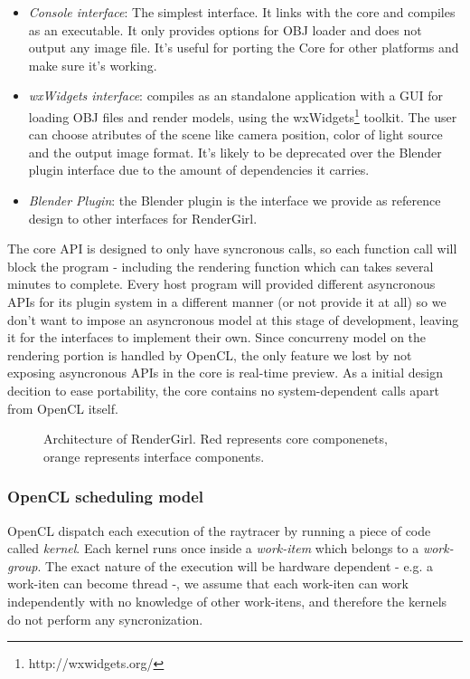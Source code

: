 \documentclass[a4paper]{sbgames}               %
\begin{document}
\begin{itemize}
\item \emph{Console interface}: The simplest interface. It links with
  the core and compiles as an executable. It only provides options for
  OBJ loader and does not output any image file. It's useful for
  porting the Core for other platforms and make sure it's working.
\item \emph{wxWidgets interface}: compiles as an standalone
  application with a GUI for loading OBJ files and render models,
  using the wxWidgets\footnote{http://wxwidgets.org/} toolkit. The
  user can choose atributes of the scene like camera position, color
  of light source and the output image format. It's likely to be
  deprecated over the Blender plugin interface due to the amount of
  dependencies it carries.
\item \emph{Blender Plugin}: the Blender plugin is the interface we
  provide as reference design to other interfaces for RenderGirl.
\end{itemize}

The core API is designed to only have syncronous calls, so each
function call will block the program - including the rendering
function which can takes several minutes to complete. Every host
program will provided different asyncronous APIs for its plugin system
in a different manner (or not provide it at all) so we don't want to
impose an asyncronous model at this stage of development, leaving it
for the interfaces to implement their own. Since concurreny model on
the rendering portion is handled by OpenCL, the only feature we lost
by not exposing asyncronous APIs in the core is real-time preview. As
a initial design decition to ease portability, the core contains no
system-dependent calls apart from OpenCL itself.

\begin{figure}
\centering

\caption{Architecture of RenderGirl. Red represents core componenets,
  orange represents interface components.}
\label{fig:architecture}
\end{figure}

\subsubsection{OpenCL scheduling model}

OpenCL dispatch each execution of the raytracer by running a piece of
code called \emph{kernel}. Each kernel runs once inside a
\emph{work-item} which belongs to a \emph{work-group}. The exact
nature of the execution will be hardware dependent - e.g. a work-iten
can become thread -, we assume that each work-iten can work
independently with no knowledge of other work-itens, and therefore the
kernels do not perform any syncronization.
\end{document}
